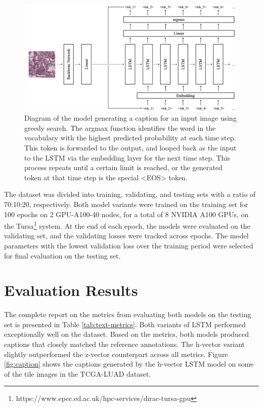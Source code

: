 \documentclass{l4proj}
\begin{document}
\begin{figure}[h!]
    \centering
    \includegraphics[width=1\linewidth]{images/greedy.png}
    \caption{Diagram of the model generating a caption for an input image using greedy search. The argmax function identifies the word in the vocabulary with the highest predicted probability at each time step. This token is forwarded to the output, and looped back as the input to the LSTM via the embedding layer for the next time step. This process repeats until a certain limit is reached, or the generated token at that time step is the special <EOS> token.}
    \label{fig:greedy}
\end{figure}

The dataset was divided into training, validating, and testing sets with a ratio of 70:10:20, respectively. Both model variants were trained on the training set for 100 epochs on 2 GPU-A100-40 nodes, for a total of 8 NVIDIA A100 GPUs, on the Tursa\footnote{https://www.epcc.ed.ac.uk/hpc-services/dirac-tursa-gpu} system. At the end of each epoch, the models were evaluated on the validating set, and the validating losses were tracked across epochs. The model parameters with the lowest validation loss over the training period were selected for final evaluation on the testing set.

\section{Evaluation Results} \label{sec:caption-results}
The complete report on the metrics from evaluating both models on the testing set is presented in Table \ref{tab:text-metrics}. Both variants of LSTM performed exceptionally well on the dataset. Based on the metrics, both models produced captions that closely matched the reference annotations. The h-vector variant slightly outperformed the z-vector counterpart across all metrics. Figure \ref{fig:caption} shows the captions generated by the h-vector LSTM model on some of the tile images in the TCGA-LUAD dataset.
\end{document}
